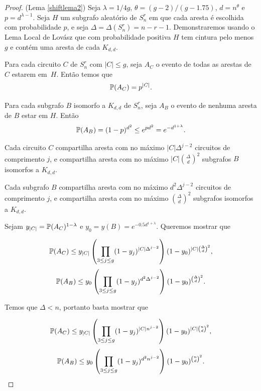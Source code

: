 \begin{proof}(Lema \ref{shiftlema2})
Seja $\lambda = 1/4g$, $\theta = (g-2)/(g-1.75)$, $d = n^\theta$ e $p = d^{\lambda-1}$. Seja $H$ um subgrafo aleatório de $S_n^r$ em que cada aresta é escolhida com probabilidade $p$, e seja $\Delta = \Delta(S_n^r) = n-r-1$.
Demonstraremos usando o Lema Local de Lovász que com probabilidade positiva $H$ tem cintura pelo menos $g$ e contém uma aresta de cada $K_{d,d}$.

Para cada circuito $C$ de $S_n^r$ com $|C| \leq g$, seja $A_C$ o evento de todas as arestas de $C$ estarem em~$H$. Então temos que \[\mathbb{P}(A_C) = p^{|C|}.\]

Para cada subgrafo $B$ isomorfo a $K_{d,d}$ de $S_n^r$, seja $A_B$ o evento de nenhuma aresta de $B$ estar em $H$. Então \[\mathbb{P}(A_B) = (1-p)^{d^2} \leq e^{pd^2} = e^{-d^{1+\lambda}}.\]

Cada circuito $C$ compartilha aresta com no máximo $|C|\Delta^{j-2}$ circuitos de comprimento $j$, e compartilha aresta com no máximo $|C|\binom{\Delta}{d}^2$ subgrafos $B$ isomorfos a $K_{d,d}$.

Cada subgrafo $B$ compartilha aresta com no máximo $d^2\Delta^{j-2}$ circuitos de comprimento $j$, e compartilha aresta com no máximo $\binom{\Delta}{d}^2$ subgrafos isomorfos a $K_{d,d}$.

Sejam $y_{|C|} = \mathbb{P}(A_C)^{1-\lambda}$ e $y_0 = y(B) = e^{-0.5d^{1+\lambda}}$. Queremos mostrar que

\begin{equation*}
\mathbb{P}(A_C) \leq y_{|C|}\left(\prod_{3\leq j\leq g}(1-y_j)^{|C|\Delta^{j-2}}\right)(1-y_0)^{|C|\binom{\Delta}{d}^2},
\end{equation*}
\begin{equation*}
\mathbb{P}(A_B)\leq y_0 \left(\prod_{3\leq j\leq g}(1-y_j)^{d^2\Delta^{j-2}}\right)(1-y_0)^{\binom{\Delta}{d}^2}.
\end{equation*}

Temos que $\Delta < n$, portanto basta mostrar que

\begin{equation}\label{shiftllleq1}
\mathbb{P}(A_C) \leq y_{|C|}\left(\prod_{3\leq j\leq g}(1-y_j)^{|C|n^{j-2}}\right)(1-y_0)^{|C|\binom{n}{d}^2},
\end{equation}
\begin{equation}\label{shiftllleq2}
\mathbb{P}(A_B)\leq y_0 \left(\prod_{3\leq j\leq g}(1-y_j)^{d^2n^{j-2}}\right)(1-y_0)^{\binom{n}{d}^2}.
\end{equation}


\end{proof}
